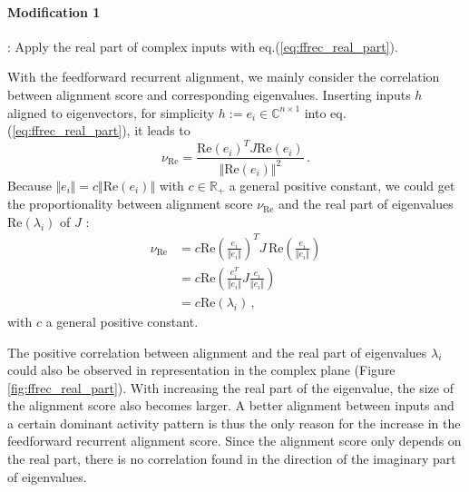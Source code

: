 \documentclass[11pt]{article}
\begin{document}
	\vspace{0.5cm}
	\paragraph{Modification 1}: Apply the real part of complex inputs with eq.(\ref{eq:ffrec_real_part}).
	
	With the feedforward recurrent alignment, we mainly consider the correlation between alignment score and corresponding eigenvalues. Inserting inputs $h$ aligned to eigenvectors, for simplicity $h := e_i \in \mathbb{C}^{n \times 1}$ into eq.(\ref{eq:ffrec_real_part}), it leads to
		\begin{equation}
			\nu_{\text{Re}} = \frac{\text{Re}(e_i)^T J \text{Re}(e_i)}{\Vert \text{Re}(e_i)\Vert^2} \, .
		\end{equation}
	Because $\Vert e_i \Vert = c \Vert \text{Re}(e_i) \Vert$ with $c \in \mathbb{R_{+}}$ a general positive constant, we could get the proportionality between alignment score $\nu_{\text{Re}}$ and the real part of eigenvalues $\text{Re}(\lambda_i)$ of $J$ :
		\begin{equation}
			\begin{split}
				\nu_{\text{Re}} & = c \text{Re}\left( \frac{e_i}{\Vert e_i \Vert} \right)^T J \, \text{Re}\left( \frac{e_i}{\Vert e_i \Vert} \right) \\
				& = c \text{Re} \left( \frac{e_i^T}{\Vert e_i \Vert} J \frac{e_i}{\Vert e_i \Vert} \right) \\
				& = c \text{Re}(\lambda_i) \, ,
			\end{split}
		\end{equation}
	with $c$ a general positive constant.
	
	The positive correlation between alignment and the real part of eigenvalues $\lambda_i$ could also be observed in representation in the complex plane (Figure \ref{fig:ffrec_real_part}). With increasing the real part of the eigenvalue, the size of the alignment score also becomes larger. 
	A better alignment between inputs and a certain dominant activity pattern is thus the only reason for the increase in the feedforward recurrent alignment score. Since the alignment score only depends on the real part, there is no correlation found in the direction of the imaginary part of eigenvalues. 
	\vspace{1cm}
\end{document}
